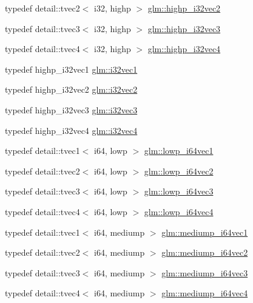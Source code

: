 \begin{CompactItemize}
\item 
typedef detail::tvec2$<$ i32, highp $>$ \hyperlink{group__gtc__type__precision_g6020d795076243085eb0d6826c849b4a}{glm::highp\_\-i32vec2}
\item 
typedef detail::tvec3$<$ i32, highp $>$ \hyperlink{group__gtc__type__precision_g95de80f73e676fb6b9976ff0d33bbc4b}{glm::highp\_\-i32vec3}
\item 
typedef detail::tvec4$<$ i32, highp $>$ \hyperlink{group__gtc__type__precision_g174af0fafdc5a9eb24150792bffa8b5c}{glm::highp\_\-i32vec4}
\item 
typedef highp\_\-i32vec1 \hyperlink{group__gtc__type__precision_g0d3741d44591183f3dee9500b4ad9ab4}{glm::i32vec1}
\item 
typedef highp\_\-i32vec2 \hyperlink{group__gtc__type__precision_gbb9ac4a278f8a8e3a3928dc9bef81089}{glm::i32vec2}
\item 
typedef highp\_\-i32vec3 \hyperlink{group__gtc__type__precision_g79a21b299190b6fee673087376753db0}{glm::i32vec3}
\item 
typedef highp\_\-i32vec4 \hyperlink{group__gtc__type__precision_g5fea6ade2c848bca1fa55636e75a10b9}{glm::i32vec4}
\item 
typedef detail::tvec1$<$ i64, lowp $>$ \hyperlink{group__gtc__type__precision_gf427ced1906a1788fdd9faab2e57c60a}{glm::lowp\_\-i64vec1}
\item 
typedef detail::tvec2$<$ i64, lowp $>$ \hyperlink{group__gtc__type__precision_gd88a04aaa07fabf57fdbad8e6b7bcc9c}{glm::lowp\_\-i64vec2}
\item 
typedef detail::tvec3$<$ i64, lowp $>$ \hyperlink{group__gtc__type__precision_ga42f666ccdb6d1ef6326882b4f377678}{glm::lowp\_\-i64vec3}
\item 
typedef detail::tvec4$<$ i64, lowp $>$ \hyperlink{group__gtc__type__precision_g95c13b9d4f94d1783e7d96534d1651d8}{glm::lowp\_\-i64vec4}
\item 
typedef detail::tvec1$<$ i64, mediump $>$ \hyperlink{group__gtc__type__precision_gd2423a91c791b9ca2f8a3ecfc71b080d}{glm::mediump\_\-i64vec1}
\item 
typedef detail::tvec2$<$ i64, mediump $>$ \hyperlink{group__gtc__type__precision_g5cf0bec13b01b6124e966360cffe15a4}{glm::mediump\_\-i64vec2}
\item 
typedef detail::tvec3$<$ i64, mediump $>$ \hyperlink{group__gtc__type__precision_ge1aa82d2b9a62a87648306205dfe69ab}{glm::mediump\_\-i64vec3}
\item 
typedef detail::tvec4$<$ i64, mediump $>$ \hyperlink{group__gtc__type__precision_gb4db11ebb425fa18fe5d15d455c360a3}{glm::mediump\_\-i64vec4}

\end{CompactItemize}
